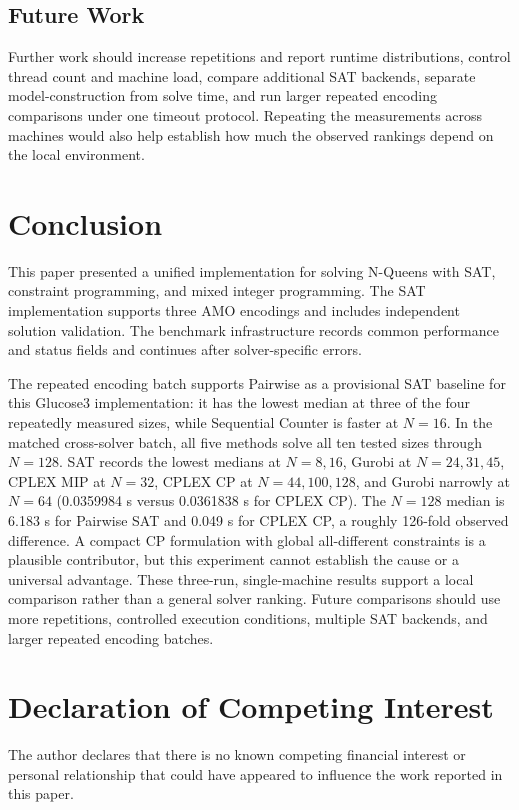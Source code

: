 \documentclass[a4paper,fleqn]{cas-sc}
\begin{document}
\subsection{Future Work}

Further work should increase repetitions and report runtime distributions, control thread count and machine load, compare additional SAT backends, separate model-construction from solve time, and run larger repeated encoding comparisons under one timeout protocol. Repeating the measurements across machines would also help establish how much the observed rankings depend on the local environment.

\section{Conclusion}

This paper presented a unified implementation for solving N-Queens with SAT, constraint programming, and mixed integer programming. The SAT implementation supports three AMO encodings and includes independent solution validation. The benchmark infrastructure records common performance and status fields and continues after solver-specific errors.

The repeated encoding batch supports Pairwise as a provisional SAT baseline for this Glucose3 implementation: it has the lowest median at three of the four repeatedly measured sizes, while Sequential Counter is faster at $N=16$. In the matched cross-solver batch, all five methods solve all ten tested sizes through $N=128$. SAT records the lowest medians at $N=8,16$, Gurobi at $N=24,31,45$, CPLEX MIP at $N=32$, CPLEX CP at $N=44,100,128$, and Gurobi narrowly at $N=64$ (0.0359984 s versus 0.0361838 s for CPLEX CP). The $N=128$ median is 6.183 s for Pairwise SAT and 0.049 s for CPLEX CP, a roughly 126-fold observed difference. A compact CP formulation with global all-different constraints is a plausible contributor, but this experiment cannot establish the cause or a universal advantage. These three-run, single-machine results support a local comparison rather than a general solver ranking. Future comparisons should use more repetitions, controlled execution conditions, multiple SAT backends, and larger repeated encoding batches.

\printcredits

\section*{Declaration of Competing Interest}
The author declares that there is no known competing financial interest or personal relationship that could have appeared to influence the work reported in this paper.
\end{document}
